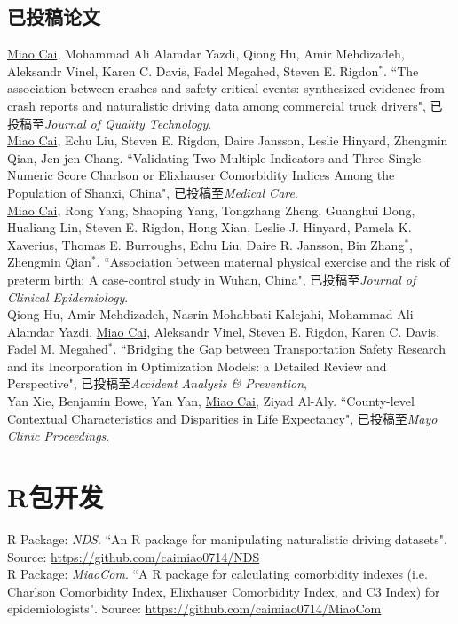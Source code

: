 \documentclass[11pt, a4paper]{article}
\newcommand{\years}[1]{\marginnote{\scriptsize #1}}
\begin{document}
\subsection*{已投稿论文}
\noindent
\years{2019}\underline{Miao Cai},  Mohammad Ali Alamdar Yazdi, Qiong Hu, Amir Mehdizadeh, Aleksandr Vinel, Karen C. Davis, Fadel Megahed, Steven E. Rigdon$^\ast$. ``The association between crashes and safety-critical events: synthesized evidence from crash reports and naturalistic driving data among commercial truck drivers", 已投稿至\emph{Journal of Quality Technology}.\\
\years{2019}\underline{Miao Cai}, Echu Liu, Steven E. Rigdon, Daire Jansson, Leslie Hinyard, Zhengmin Qian, Jen-jen Chang. ``Validating Two Multiple Indicators and Three Single Numeric Score Charlson or Elixhauser Comorbidity Indices Among the Population of Shanxi, China", 已投稿至\emph{Medical Care}.\\
\years{2019}\underline{Miao Cai}, Rong Yang, Shaoping Yang, Tongzhang Zheng, Guanghui Dong, Hualiang Lin, Steven E. Rigdon, Hong Xian, Leslie J. Hinyard, Pamela K. Xaverius, Thomas E. Burroughs, Echu Liu, Daire R. Jansson, Bin Zhang$^\ast$, Zhengmin Qian$^\ast$. ``Association between maternal physical exercise and the risk of preterm birth: A case-control study in Wuhan, China", 已投稿至\emph{Journal of Clinical Epidemiology}.\\
\years{2019}Qiong Hu, Amir Mehdizadeh, Nasrin Mohabbati Kalejahi, Mohammad Ali Alamdar Yazdi, \underline{Miao Cai}, Aleksandr Vinel, Steven E. Rigdon, Karen C. Davis, Fadel M. Megahed$^\ast$. ``Bridging the Gap between Transportation Safety Research and its Incorporation in Optimization Models: a Detailed Review and Perspective", 已投稿至\emph{Accident Analysis \& Prevention},\\
\years{2019}Yan Xie, Benjamin Bowe, Yan Yan, \underline{Miao Cai}, Ziyad Al-Aly. ``County-level Contextual Characteristics and Disparities in Life Expectancy", 已投稿至\emph{Mayo Clinic Proceedings}.

\section*{R包开发}
\years{2019}R Package: \emph{NDS}. ``An R package for manipulating naturalistic driving datasets". Source: \href{https://github.com/caimiao0714/NDS}{https://github.com/caimiao0714/NDS}\\
\years{2017}R Package: \emph{MiaoCom}. ``A R package for calculating comorbidity indexes (i.e. Charlson Comorbidity Index, Elixhauser Comorbidity Index, and C3 Index) for epidemiologists". Source: \href{https://github.com/caimiao0714/MiaoCom}{https://github.com/caimiao0714/MiaoCom}
\end{document}
